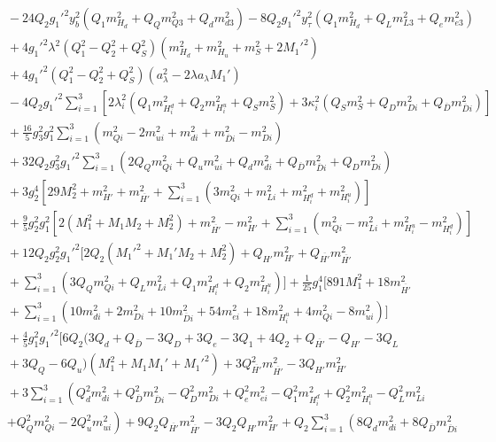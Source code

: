 \documentclass[preprint,amsmath,amssymb,aps,superscriptaddress,prd,showpacs,floatfix,nofootinbib]{revtex4-1}
\begin{document}
\begin{subequations}
\begin{align}
&{}-24Q_2g_1'^2y_b^2\left ( Q_1m_{H_d}^2+Q_Qm_{Q3}^2+Q_dm_{d3}^2\right )-8Q_2g_1'^2y_\tau^2\left ( Q_1m_{H_d}^2+Q_Lm_{L3}^2+Q_em_{e3}^2\right )\nonumber\\
&{}+4g_1'^2\lambda^2\left ( Q_1^2-Q_2^2+Q_S^2\right )\left ( m_{H_d}^2+m_{H_u}^2+m_S^2+2M_1'^2\right )\nonumber\\
&{}+4g_1'^2\left ( Q_1^2-Q_2^2+Q_S^2\right )\left ( a_\lambda^2-2\lambda a_\lambda M_1'\right )\nonumber\\
&{}-4Q_2g_1'^2\sum_{i=1}^3\left [ 2\lambda_i^2\left ( Q_1m_{H_i^d}^2+Q_2m_{H_i^u}^2+Q_Sm_S^2\right )+3\kappa_i^2\left ( Q_Sm_S^2+Q_Dm_{Di}^2+Q_{\overline{D}}m_{\overline{D}i}^2\right )\right ]\nonumber\\
&{}+\frac{16}{5}g_3^2g_1^2\sum_{i=1}^3\left ( m_{Qi}^2-2m_{ui}^2+m_{di}^2+m_{\overline{D}i}^2-m_{Di}^2\right )\nonumber\\
&{}+32Q_2g_3^2g_1'^2\sum_{i=1}^3\left ( 2Q_Qm_{Qi}^2+Q_um_{ui}^2+Q_dm_{di}^2+Q_{\overline{D}}m_{\overline{D}i}^2+Q_Dm_{Di}^2\right )\nonumber\\
&{}+3g_2^4\left [ 29M_2^2+m_{H'}^2+m_{\overline{H'}}^2+\sum_{i=1}^3\left ( 3m_{Qi}^2+m_{Li}^2+m_{H_i^d}^2+m_{H_i^u}^2\right )\right ]\nonumber\\
&{}+\frac{9}{5}g_2^2g_1^2\left [ 2\left ( M_1^2+M_1M_2+M_2^2\right )+m_{\overline{H'}}^2-m_{H'}^2+\sum_{i=1}^3\left ( m_{Qi}^2-m_{Li}^2+m_{H_i^u}^2-m_{H_i^d}^2\right )\right ]\nonumber\\
&{}+12Q_2g_2^2g_1'^2\bigg [ 2Q_2\left ( M_1'^2+M_1'M_2+M_2^2\right )+Q_{H'}m_{H'}^2+Q_{\overline{H'}}m_{\overline{H'}}^2\nonumber\\
&{}+\sum_{i=1}^3\left ( 3Q_Qm_{Qi}^2+Q_Lm_{Li}^2+Q_1m_{H_i^d}^2+Q_2m_{H_i^u}^2\right )\bigg ]+\frac{1}{25}g_1^4\bigg [ 891M_1^2+18m_{\overline{H'}}^2\nonumber\\
&{}+\sum_{i=1}^3\left ( 10m_{di}^2+2m_{Di}^2+10m_{\overline{D}i}^2+54m_{ei}^2+18m_{H_i^u}^2+4m_{Qi}^2-8m_{ui}^2\right )\bigg ]\nonumber\\
&{}+\frac{4}{5}g_1^2g_1'^2\bigg [ 6Q_2\big ( 3Q_d+Q_{\overline{D}}-3Q_D+3Q_e-3Q_1+4Q_2+Q_{\overline{H'}}-Q_{H'}-3Q_L\nonumber\\
&{}+3Q_Q-6Q_u\big )\left ( M_1^2+M_1M_1'+M_1'^2\right )+3Q_{\overline{H'}}^2m_{\overline{H'}}^2-3Q_{H'}m_{H'}^2\nonumber\\
&{}+3\sum_{i=1}^3\left ( Q_d^2m_{di}^2+Q_{\overline{D}}^2m_{\overline{D}i}^2-Q_D^2m_{Di}^2+Q_e^2m_{ei}^2-Q_1^2m_{H_i^d}^2+Q_2^2m_{H_i^u}^2-Q_L^2m_{Li}^2\right.\nonumber\\
&{}\left.+Q_Q^2m_{Qi}^2-2Q_u^2m_{ui}^2\right )+9Q_2Q_{\overline{H'}}m_{\overline{H'}}^2-3Q_2Q_{H'}m_{H'}^2+Q_2\sum_{i=1}^3\left ( 8Q_dm_{di}^2+8Q_{\overline{D}}m_{\overline{D}i}^2\right.\nonumber\\

\end{align}
\end{subequations}
\end{document}
